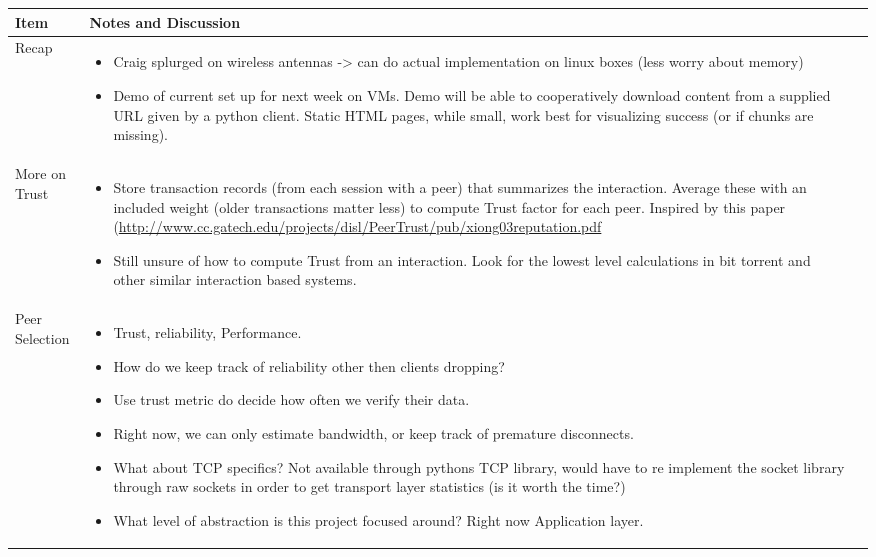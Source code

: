 \documentclass[a4wide,10pt]{extarticle}
\begin{document}
\vspace{0.5cm}
\begin{center}
\begin{tabular}{| m{3.0cm} | m{12.6cm} | m{2cm}|} \hline
\textbf{Item} & \textbf{Notes and Discussion}\\ \hline

Recap & 
	\begin{itemize}
		\item Craig splurged on wireless antennas -> can do actual implementation on linux boxes (less worry about memory)
		\item Demo of current set up for next week on VMs. Demo will be able to cooperatively download content from a supplied URL given by a python client. Static HTML pages, while small, work best for visualizing success (or if chunks are missing).
	\end{itemize} 
\\ \hline

More on Trust &
	\begin{itemize}
		\item Store transaction records (from each session with a peer) that summarizes the interaction. Average these with an included weight (older transactions matter less) to compute Trust factor for each peer. Inspired by this paper (\url{http://www.cc.gatech.edu/projects/disl/PeerTrust/pub/xiong03reputation.pdf}
		\item Still unsure of how to compute Trust from an interaction. Look for the lowest level calculations in bit torrent and other similar interaction based systems.
	\end{itemize}
\\ \hline

Peer Selection &
	\begin{itemize}
		\item Trust, reliability, Performance.
		\item How do we keep track of reliability other then clients dropping?
		\item Use trust metric do decide how often we verify their data.
		\item Right now, we can only estimate bandwidth, or keep track of premature disconnects.
		\item What about TCP specifics? Not available through pythons TCP library, would have to re implement the socket library through raw sockets in order to get transport layer statistics (is it worth the time?)
		\item What level of abstraction is this project focused around? Right now Application layer.
	\end{itemize}
\\ \hline


\end{tabular}
\end{center}
\end{document}

